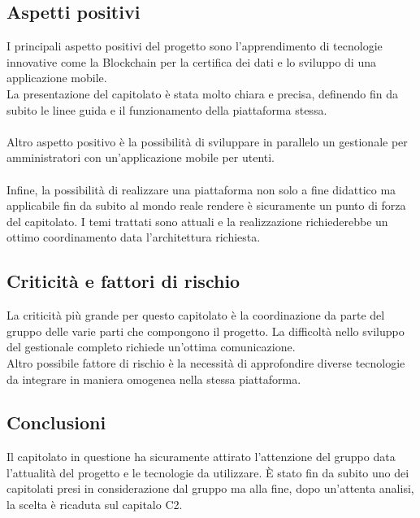 \subsection{Aspetti positivi}
I principali aspetto positivi del progetto sono l'apprendimento di tecnologie innovative come la Blockchain per la certifica dei dati e lo sviluppo di una applicazione mobile.\\
La presentazione del capitolato è stata molto chiara e precisa, definendo fin da subito le linee guida e il funzionamento della piattaforma stessa. \\\\
Altro aspetto positivo è la possibilità di sviluppare in parallelo un gestionale per amministratori con un'applicazione mobile per utenti.\\\\
Infine, la possibilità di realizzare una piattaforma non solo a fine didattico ma applicabile fin da subito al mondo reale rendere è sicuramente un punto di forza del capitolato. I temi trattati sono attuali e la realizzazione richiederebbe un ottimo coordinamento data l'architettura richiesta.


\subsection{Criticità e fattori di rischio}
La criticità più grande per questo capitolato è la coordinazione da parte del gruppo delle varie parti che compongono il progetto. La difficoltà nello sviluppo del gestionale completo richiede un'ottima comunicazione. \\
Altro possibile fattore di rischio è la necessità di approfondire diverse tecnologie da integrare in maniera omogenea nella stessa piattaforma.

\subsection{Conclusioni}
Il capitolato in questione ha sicuramente attirato l'attenzione del gruppo data l'attualità del progetto e le tecnologie da utilizzare. È stato fin da subito uno dei capitolati presi in considerazione dal gruppo ma alla fine, dopo un'attenta analisi, la scelta è ricaduta sul capitalo C2. 

\newpage